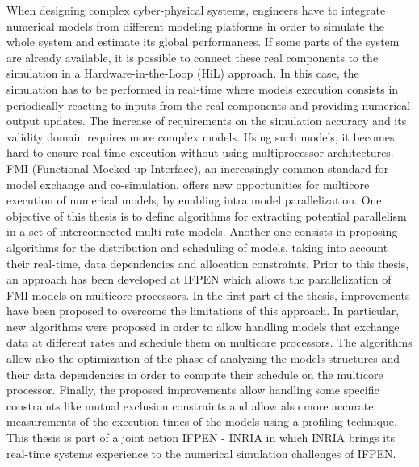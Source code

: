When designing complex cyber-physical systems, engineers have to integrate numerical models from different modeling platforms in order to simulate the whole system and estimate its global performances. If some parts of the system are already available, it is possible to connect these real components to the simulation in a Hardware-in-the-Loop (HiL) approach. In this case, the simulation has to be performed in real-time where models execution consists in periodically reacting to inputs from the real components and providing numerical output updates. The increase of requirements on the simulation accuracy and its validity domain requires more complex models. Using such models, it becomes hard to ensure real-time execution without using multiprocessor architectures. FMI (Functional Mocked-up Interface), an increasingly common standard for model exchange and co-simulation, offers new opportunities for multicore execution of numerical models, by enabling intra model parallelization. One objective of this thesis is to define algorithms for extracting potential parallelism in a set of interconnected multi-rate models. Another one consists in proposing algorithms for the distribution and scheduling of models, taking into account their real-time, data dependencies and allocation constraints. Prior to this thesis, an approach has been developed at IFPEN which allows the parallelization of FMI models on multicore processors. In the first part of the thesis, improvements have been proposed to overcome the limitations of this approach. In particular, new algorithms were proposed in order to allow handling models that exchange data at different rates and schedule them on multicore processors. The algorithms allow also the optimization of the phase of analyzing the models structures and their data dependencies in order to compute their schedule on the multicore processor. Finally, the proposed improvements allow handling some specific constraints like mutual exclusion constraints and allow also more accurate measurements of the execution times of the models using a profiling technique. This thesis is part of a joint action IFPEN - INRIA in which INRIA brings its real-time systems experience to the numerical simulation challenges of IFPEN.
